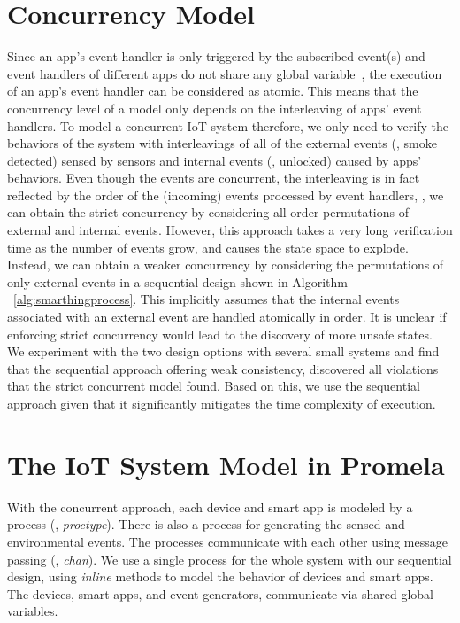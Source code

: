 \section{Concurrency Model}
{\color{black}Since an app's event handler is only triggered by the subscribed event(s) and event handlers of different apps do not share any global variable~\cite{iftttpage,Samsung:smartthings,Apple:homekit,Amazon:alexa,Microsoft:iot}, the execution of an app's event handler can be considered as atomic. 
This means that the concurrency level of a model only depends on the interleaving of apps' event handlers. To model a concurrent IoT system therefore, we 
only need to verify the behaviors of the system with interleavings of all of 
the external events (\eg, smoke detected) sensed by sensors and internal events (\eg, unlocked) caused by apps' behaviors. Even though the events are concurrent, the interleaving is in fact reflected by the order of the (incoming) events processed by event handlers, \ie, we can obtain the strict concurrency by 
considering all order permutations of  external and internal events. 
However, this approach takes a very long verification time 
as the number of events grow, and causes the state space to explode. Instead, we can obtain a weaker concurrency by considering the permutations of only external events in a sequential design shown in Algorithm ~\ref{alg:smarthingprocess}. This implicitly assumes that the internal events associated with
an external event are handled atomically in order.
It is unclear if enforcing strict concurrency would lead to 
the discovery of more unsafe states. We experiment with the two design options with several small systems and find that the sequential approach offering
weak consistency, discovered all violations that the strict concurrent model found. Based on this, we use the sequential approach given that it 
significantly mitigates the time complexity of execution.}


\section{The IoT System Model in Promela}
{\color{black}With the concurrent approach, each device and smart app is modeled by a process (\ie, \textit{proctype}).
There is also a process for generating the sensed and environmental events.
The processes communicate with each other using message passing (\ie, \textit{chan}).
We use a single process for the whole system with our sequential design,
using \textit{inline} methods to model the behavior of devices and smart apps.
The devices, smart apps, and event generators, communicate via shared global variables.}


